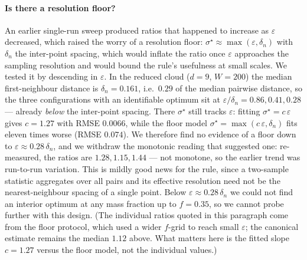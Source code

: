 \documentclass[11pt]{article}
\theoremstyle{remark}
\begin{document}
\paragraph{Is there a resolution floor?} An earlier single-run sweep produced ratios that happened to increase as $\varepsilon$ decreased,
which raised the worry of a resolution floor:
$\sigma^\star\approx\max(\varepsilon,\delta_n)$ with $\delta_n$ the inter-point spacing, which would
inflate the ratio once $\varepsilon$ approaches the sampling resolution and would bound the rule's
usefulness at small scales. We tested it by descending in $\varepsilon$. In the reduced cloud
($d=9$, $W=200$) the median first-neighbour distance is $\delta_n=0.161$, i.e.\ $0.29$ of the median
pairwise distance, so the three configurations with an identifiable optimum sit at
$\varepsilon/\delta_n=0.86,0.41,0.28$ --- already \emph{below} the inter-point spacing. There
$\sigma^\star$ still tracks $\varepsilon$: fitting $\sigma^\star=c\,\varepsilon$ gives $c=1.27$ with
RMSE $0.0066$, while the floor model $\sigma^\star=\max(c\,\varepsilon,\delta_n)$ fits eleven times
worse (RMSE $0.074$). We therefore find no evidence of a floor down to $\varepsilon\approx0.28\,
\delta_n$, and we withdraw the monotonic reading that suggested one: re-measured, the ratios are
$1.28,1.15,1.44$ --- not monotone, so the earlier trend was run-to-run variation. This is mildly
good news for the rule, since a two-sample statistic aggregates over all pairs and its effective
resolution need not be the nearest-neighbour spacing of a single point. Below
$\varepsilon\approx0.28\,\delta_n$ we could not find an interior optimum at any mass fraction up to
$f=0.35$, so we cannot probe further with this design. (The individual ratios quoted in this
paragraph come from the floor protocol, which used a wider $f$-grid to reach small $\varepsilon$;
the canonical estimate remains the median $1.12$ above. What matters here is the fitted slope
$c=1.27$ versus the floor model, not the individual values.)
\end{document}

